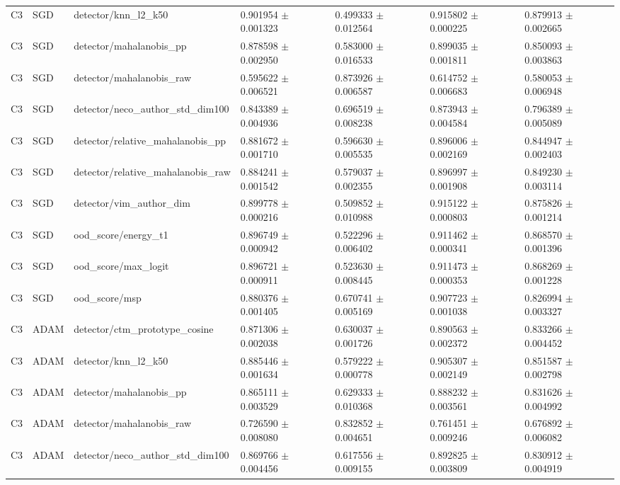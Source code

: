 \begin{longtable}{lllllll}
C3 & SGD & detector/knn\_l2\_k50 & 0.901954 $\pm$ 0.001323 & 0.499333 $\pm$ 0.012564 & 0.915802 $\pm$ 0.000225 & 0.879913 $\pm$ 0.002665 \\
C3 & SGD & detector/mahalanobis\_pp & 0.878598 $\pm$ 0.002950 & 0.583000 $\pm$ 0.016533 & 0.899035 $\pm$ 0.001811 & 0.850093 $\pm$ 0.003863 \\
C3 & SGD & detector/mahalanobis\_raw & 0.595622 $\pm$ 0.006521 & 0.873926 $\pm$ 0.006587 & 0.614752 $\pm$ 0.006683 & 0.580053 $\pm$ 0.006948 \\
C3 & SGD & detector/neco\_author\_std\_dim100 & 0.843389 $\pm$ 0.004936 & 0.696519 $\pm$ 0.008238 & 0.873943 $\pm$ 0.004584 & 0.796389 $\pm$ 0.005089 \\
C3 & SGD & detector/relative\_mahalanobis\_pp & 0.881672 $\pm$ 0.001710 & 0.596630 $\pm$ 0.005535 & 0.896006 $\pm$ 0.002169 & 0.844947 $\pm$ 0.002403 \\
C3 & SGD & detector/relative\_mahalanobis\_raw & 0.884241 $\pm$ 0.001542 & 0.579037 $\pm$ 0.002355 & 0.896997 $\pm$ 0.001908 & 0.849230 $\pm$ 0.003114 \\
C3 & SGD & detector/vim\_author\_dim & 0.899778 $\pm$ 0.000216 & 0.509852 $\pm$ 0.010988 & 0.915122 $\pm$ 0.000803 & 0.875826 $\pm$ 0.001214 \\
C3 & SGD & ood\_score/energy\_t1 & 0.896749 $\pm$ 0.000942 & 0.522296 $\pm$ 0.006402 & 0.911462 $\pm$ 0.000341 & 0.868570 $\pm$ 0.001396 \\
C3 & SGD & ood\_score/max\_logit & 0.896721 $\pm$ 0.000911 & 0.523630 $\pm$ 0.008445 & 0.911473 $\pm$ 0.000353 & 0.868269 $\pm$ 0.001228 \\
C3 & SGD & ood\_score/msp & 0.880376 $\pm$ 0.001405 & 0.670741 $\pm$ 0.005169 & 0.907723 $\pm$ 0.001038 & 0.826994 $\pm$ 0.003327 \\
C3 & ADAM & detector/ctm\_prototype\_cosine & 0.871306 $\pm$ 0.002038 & 0.630037 $\pm$ 0.001726 & 0.890563 $\pm$ 0.002372 & 0.833266 $\pm$ 0.004452 \\
C3 & ADAM & detector/knn\_l2\_k50 & 0.885446 $\pm$ 0.001634 & 0.579222 $\pm$ 0.000778 & 0.905307 $\pm$ 0.002149 & 0.851587 $\pm$ 0.002798 \\
C3 & ADAM & detector/mahalanobis\_pp & 0.865111 $\pm$ 0.003529 & 0.629333 $\pm$ 0.010368 & 0.888232 $\pm$ 0.003561 & 0.831626 $\pm$ 0.004992 \\
C3 & ADAM & detector/mahalanobis\_raw & 0.726590 $\pm$ 0.008080 & 0.832852 $\pm$ 0.004651 & 0.761451 $\pm$ 0.009246 & 0.676892 $\pm$ 0.006082 \\
C3 & ADAM & detector/neco\_author\_std\_dim100 & 0.869766 $\pm$ 0.004456 & 0.617556 $\pm$ 0.009155 & 0.892825 $\pm$ 0.003809 & 0.830912 $\pm$ 0.004919 \\

\end{longtable}
